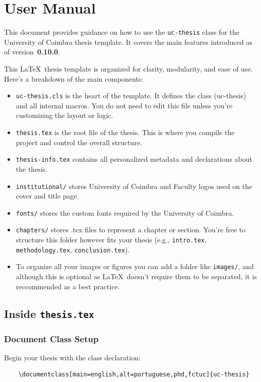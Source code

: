 \chapter{User Manual}
This document provides guidance on how to use the \texttt{uc-thesis} class for the University of Coimbra thesis template. It covers the main features introduced as of version~\textbf{0.10.0}.

This \LaTeX\ thesis template is organized for clarity, modularity, and ease of use. Here's a breakdown of the main components:
\begin{itemize}
    \item \texttt{uc-thesis.cls} is the heart of the template. It defines the class (uc-thesis) and all internal macros. You do not need to edit this file unless you're customizing the layout or logic.
    \item \texttt{thesis.tex} is the root file of the thesis. This is where you compile the project and control the overall structure.
    \item \texttt{thesis-info.tex} contains all personalized metadata and declarations about the thesis.
    \item \texttt{institutional/} stores University of Coimbra and Faculty logos used on the cover and title page.
    \item \texttt{fonts/} stores the custom fonts required by the University of Coimbra.
    \item \texttt{chapters/} stores .tex files to represent a chapter or section. You’re free to structure this folder however fits your thesis (e.g., \texttt{intro.tex}, \texttt{methodology.tex}, \texttt{conclusion.tex}).
    \item To organize all your images or figures you can add a folder like \texttt{images/}, and although this is optional as \LaTeX\ doesn’t require them to be separated, it is reccommended as a best practice.
\end{itemize}
\section{Inside \texttt{thesis.tex}}
\subsection{Document Class Setup}

Begin your thesis with the class declaration:

\begin{verbatim}
    \documentclass[main=english,alt=portuguese,phd,fctuc]{uc-thesis}
\end{verbatim}

